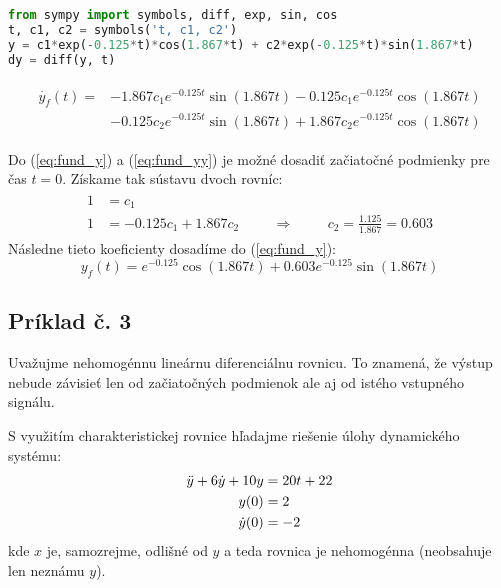 \documentclass[a4paper, 10pt, ]{article}
\begin{document}
\begin{lstlisting}[language=python,float=htpb,label=lst:diff_y,caption={Príklad derivácie výrazu (symbolického) v jazyku Python}]
from sympy import symbols, diff, exp, sin, cos
t, c1, c2 = symbols('t, c1, c2')
y = c1*exp(-0.125*t)*cos(1.867*t) + c2*exp(-0.125*t)*sin(1.867*t)
dy = diff(y, t)
\end{lstlisting}

\begin{align}\label{eq:fund_yy}
    \begin{split}
        \Dot{y_f}(t) = &-1.867c_{1}e^{-0.125t}\sin{(1.867t)} - 0.125c_{1}e^{-0.125t}\cos{(1.867t)} \\
        &- 0.125c_2 e^{-0.125t}\sin{(1.867t)} + 1.867c_2 e^{-0.125t}\cos{(1.867t)}
    \end{split}
\end{align}

Do (\ref{eq:fund_y}) a (\ref{eq:fund_yy}) je možné dosadiť začiatočné podmienky pre čas $t=0$. Získame tak sústavu dvoch rovníc:
\begin{align}
    \begin{split}
        1 &= c_1 \\
        1 &= -0.125c_1 + 1.867 c_2 \hspace{1cm} \Rightarrow \hspace{1cm} c_2 = \frac{1.125}{1.867} = 0.603
    \end{split}
\end{align}
Následne tieto koeficienty dosadíme do (\ref{eq:fund_y}):
\begin{equation}
    y_f(t) = e^{-0.125}\cos{(1.867t)} + 0.603e^{-0.125}\sin{(1.867t)}
\end{equation}







\subsection{Príklad č. 3}

Uvažujme nehomogénnu lineárnu diferenciálnu rovnicu. To znamená, že výstup nebude závisieť len od začiatočných podmienok ale aj od istého vstupného signálu. 

S využitím charakteristickej rovnice hľadajme riešenie úlohy dynamického systému:
\begin{align}
\begin{split}
    \Ddot{y} + 6 \Dot{y} + 10y &= 20t + 22 \\
    y(0) &= 2 \\
    \Dot{y}(0) &= -2
\end{split}
\end{align}
kde $x$ je, samozrejme, odlišné od $y$ a teda rovnica je nehomogénna (neobsahuje len neznámu $y$).
\end{document}
